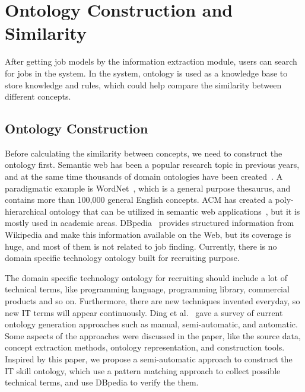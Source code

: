 \section{Ontology Construction and Similarity}
\label{sec1}
 
After getting job models by the information extraction module, users can search for jobs in the system. In the system, ontology is used as a knowledge base to store knowledge and rules, which could help compare the similarity between different concepts.

\subsection{Ontology Construction}

Before calculating the similarity between concepts, we need to construct the ontology first. Semantic web has been a popular research topic in previous years, and at the same time thousands of domain ontologies have been created~\cite{ding2004swoogle}. A paradigmatic example is WordNet~\cite{fellbaum1998wordnet}, which is a general purpose thesaurus, and contains more than 100,000 general English concepts. ACM has created a poly-hierarchical ontology that can be utilized in semantic web applications~\cite{acm2012class}, but it is mostly used in academic areas. DBpedia~\cite{bizer2009dbpedia} provides structured information from Wikipedia and make this information available on the Web, but its coverage is huge, and most of them is not related to job finding. Currently, there is no domain specific technology ontology built for recruiting purpose.

The domain specific technology ontology for recruiting should include a lot of technical terms, like programming language, programming library, commercial products and so on. Furthermore, there are new techniques invented everyday, so new IT terms will appear continuously. Ding et al.~\cite{ding2002ontology} gave a survey of current ontology generation approaches such as manual, semi-automatic, and automatic. Some aspects of the approaches were discussed in the paper, like the source data, concept extraction methods, ontology representation, and construction tools. Inspired by this paper, we propose a semi-automatic approach to construct the IT skill ontology, which use a pattern matching approach to collect possible technical terms, and use DBpedia to verify the them.

